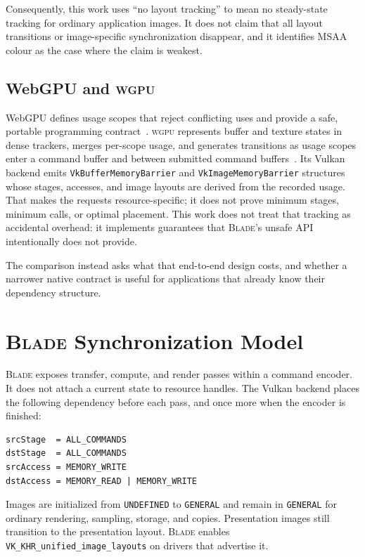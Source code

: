 \documentclass[10pt,twocolumn]{article}
\newcommand{\blade}{\textsc{Blade}}
\newcommand{\wgpu}{\textsc{wgpu}}
\begin{document}
Consequently, this work uses ``no layout tracking'' to mean no steady-state
tracking for ordinary application images. It does not claim that all layout
transitions or image-specific synchronization disappear, and it identifies MSAA
colour as the case where the claim is weakest.

\subsection{WebGPU and \wgpu}

WebGPU defines usage scopes that reject conflicting uses and provide a safe,
portable programming contract~\cite{webgpu-spec}. \wgpu{} represents buffer
and texture states in dense trackers, merges per-scope usage, and generates
transitions as usage scopes enter a command buffer and between submitted
command buffers~\cite{wgpu-trackers}. Its Vulkan backend
emits \texttt{VkBufferMemoryBarrier} and \texttt{VkImageMemoryBarrier}
structures whose stages, accesses, and image layouts are derived from the
recorded usage. That makes the requests resource-specific; it does not prove
minimum stages, minimum calls, or optimal placement. This work does not treat
that tracking as accidental overhead: it implements guarantees that \blade's
unsafe API intentionally does not provide.

The comparison instead asks what that end-to-end design costs,
and whether a narrower native contract is useful for applications that already
know their dependency structure.

\section{\blade{} Synchronization Model}

\blade{} exposes transfer, compute, and render passes within a command encoder.
It does not attach a current state to resource handles. The Vulkan backend
places the following dependency before each pass, and once more when the
encoder is finished:

\begin{verbatim}
srcStage  = ALL_COMMANDS
dstStage  = ALL_COMMANDS
srcAccess = MEMORY_WRITE
dstAccess = MEMORY_READ | MEMORY_WRITE
\end{verbatim}

Images are initialized from \texttt{UNDEFINED} to \texttt{GENERAL} and remain
in \texttt{GENERAL} for ordinary rendering, sampling, storage, and copies.
Presentation images still transition to the presentation layout. \blade{}
enables \texttt{VK\_KHR\_unified\_image\_layouts} on drivers that advertise it.
\end{document}
